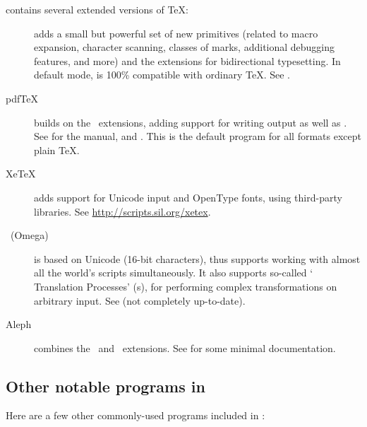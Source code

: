 \documentclass{article}
\begin{document}
\TL{} contains several extended versions of \TeX:

\begin{description}

\item [\eTeX] adds a small but powerful set of new primitives
\label{text:etex} (related to macro expansion, character scanning,
classes of marks, additional debugging features, and more) and the
\TeXXeT{} extensions for bidirectional typesetting.  In default mode,
\eTeX{} is 100\% compatible with ordinary \TeX. See
.

\item [pdf\TeX] builds on the \eTeX\ extensions, adding support for 
writing  output as well as \dvi{}.  See
 for the manual, and
.  This is the
default program for all formats except plain \TeX.

\item [Xe\TeX] adds support for Unicode input and OpenType fonts, using
third-party libraries.  See \url{http://scripts.sil.org/xetex}.

\item [\OMEGA\ (Omega)] is based on Unicode (16-bit characters), thus
supports working with almost all the world's scripts simultaneously. It
also supports so-called `\OMEGA{} Translation Processes' (s),
for performing complex transformations on arbitrary input. See
 (not completely up-to-date).

\item [Aleph] combines the \OMEGA\ and \eTeX\ extensions.  
See  for some minimal documentation.

\end{description} 


\subsection{Other notable programs in \protect\TL}

Here are a few other commonly-used programs included in \TL{}:
\end{document}
